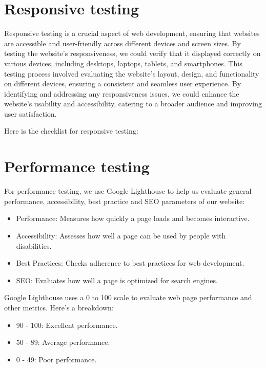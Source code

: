 



\section{Responsive testing}
Responsive testing is a crucial aspect of web development, ensuring that
websites are accessible and user-friendly across different devices and
screen sizes. By testing the website's responsiveness, we could verify
that it displayed correctly on various devices, including desktops,
laptops, tablets, and smartphones. This testing process involved
evaluating the website's layout, design, and functionality on different
devices, ensuring a consistent and seamless user experience. By
identifying and addressing any responsiveness issues, we could enhance
the website's usability and accessibility, catering to a broader audience
and improving user satisfaction.

Here is the checklist for responsive testing:


\section{Performance testing}
For performance testing, we use Google Lighthouse to help us evaluate general performance, accessibility, best practice and SEO parameters of our website:
\begin{itemize}
  \item Performance: Measures how quickly a page loads and becomes interactive.
  \item Accessibility: Assesses how well a page can be used by people with disabilities.
  \item Best Practices: Checks adherence to best practices for web development.
  \item SEO: Evaluates how well a page is optimized for search engines.
\end{itemize}
Google Lighthouse uses a 0 to 100 scale to evaluate web page performance and other metrics. Here’s a breakdown:
\begin{itemize}
  \item 90 - 100: Excellent performance.
  \item 50 - 89: Average performance.
  \item 0 - 49: Poor performance.
\end{itemize}


